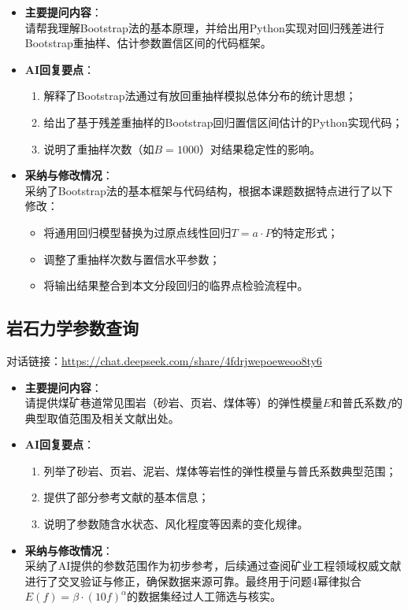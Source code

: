 \documentclass[12pt,a4paper]{article}
\begin{document}
\begin{itemize}
    \item \textbf{主要提问内容}：\\
    请帮我理解Bootstrap法的基本原理，并给出用Python实现对回归残差进行Bootstrap重抽样、估计参数置信区间的代码框架。
    
    \item \textbf{AI回复要点}：
    \begin{enumerate}
        \item 解释了Bootstrap法通过有放回重抽样模拟总体分布的统计思想；
        \item 给出了基于残差重抽样的Bootstrap回归置信区间估计的Python实现代码；
        \item 说明了重抽样次数（如$B=1000$）对结果稳定性的影响。
    \end{enumerate}
    
    \item \textbf{采纳与修改情况}：\\
    采纳了Bootstrap法的基本框架与代码结构，根据本课题数据特点进行了以下修改：
    \begin{itemize}
        \item 将通用回归模型替换为过原点线性回归$T = a \cdot P$的特定形式；
        \item 调整了重抽样次数与置信水平参数；
        \item 将输出结果整合到本文分段回归的临界点检验流程中。
    \end{itemize}
\end{itemize}

\subsection{岩石力学参数查询}

对话链接：\url{https://chat.deepseek.com/share/4fdrjwepoeweoo8ty6}

\begin{itemize}
    \item \textbf{主要提问内容}：\\
    请提供煤矿巷道常见围岩（砂岩、页岩、煤体等）的弹性模量$E$和普氏系数$f$的典型取值范围及相关文献出处。
    
    \item \textbf{AI回复要点}：
    \begin{enumerate}
        \item 列举了砂岩、页岩、泥岩、煤体等岩性的弹性模量与普氏系数典型范围；
        \item 提供了部分参考文献的基本信息；
        \item 说明了参数随含水状态、风化程度等因素的变化规律。
    \end{enumerate}
    
    \item \textbf{采纳与修改情况}：\\
    采纳了AI提供的参数范围作为初步参考，后续通过查阅矿业工程领域权威文献进行了交叉验证与修正，确保数据来源可靠。最终用于问题4幂律拟合$E(f) = \beta \cdot (10f)^\alpha$的数据集经过人工筛选与核实。
\end{itemize}
\end{document}
